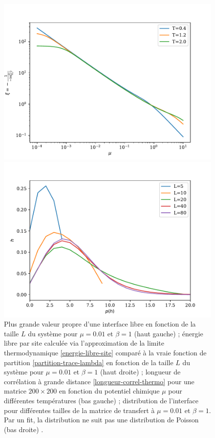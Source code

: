 \begin{figure}
\begin{minipage}{0.4\linewidth}
    	\includegraphics[width=\linewidth]{chap4/longueur-correl.pdf}
	\end{minipage}
	\begin{minipage}{0.4\linewidth}
    	\includegraphics[width=\linewidth]{chap4/distribution-taille-finie.pdf}
	\end{minipage}	
	\caption{Plus grande valeur propre d'une interface libre en fonction de la taille $L$ du système pour $\mu = 0.01$ et $\beta = 1$ (haut gauche)  ; énergie libre par site calculée via l'approximation de la limite thermodynamique \ref{energie-libre-site} comparé à la vraie fonction de partition \ref{partition-trace-lambda} en fonction de la taille $L$ du système pour $\mu=0.01$ et $\beta = 1$ (haut droite) ; longueur de corrélation à grande distance \ref{longueur-correl-thermo} pour une matrice $200\times200$ en fonction du potentiel chimique $\mu$ pour différentes températures (bas gauche) ; distribution de l'interface pour différentes tailles de la matrice de transfert à $\mu=0.01$ et $\beta = 1$. Par un fit, la distribution ne suit pas une distribution de Poisson (bas droite) .}
	\vspace{-0.5cm}
\end{figure}  


